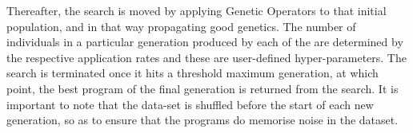 \documentclass[a4paper,12pt]{article}
\begin{document}
            \begin{minipage}{.4\textwidth}
                \par{
                    Thereafter, the search is moved by applying Genetic Operators to that initial population, and in that 
                    way propagating good genetics. The number of individuals in a particular generation produced by each of the  
                    are determined by the respective application rates and these are user-defined hyper-parameters. The search is terminated once it hits a threshold maximum generation, at 
                    which point, the best program of the final generation is returned from the search. It is important to note that the data-set is shuffled before the start of each 
                    new generation, so as to ensure that the programs do memorise noise in the dataset.  
                }
            \end{minipage}
\end{document}
